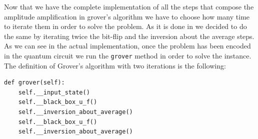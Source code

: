 \documentclass[english]{article}
\begin{document}
				\newpage
				Now that we have the complete implementation of all the steps that compose the amplitude amplification in grover's algorithm we have to choose how many time to iterate them in order to solve the problem. As it is done in \cite[G.Nannicini, 2020]{introNoPh} we decided to do the same by iterating twice the bit-flip and the inversion about the average steps. As we can see in the actual implementation, once the problem has been encoded in the quantum circuit we run the \texttt{grover} method in order to solve the instance. The definition of Grover's algorithm with two iterations is the following:
				\begin{lstlisting}[]
def grover(self):
    self.__input_state()
    self.__black_box_u_f()
    self.__inversion_about_average()
    self.__black_box_u_f()
    self.__inversion_about_average()
				\end{lstlisting}
				
\end{document}
